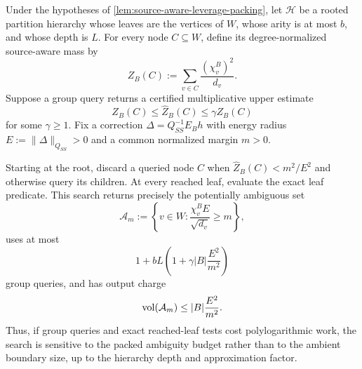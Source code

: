 \begin{lemma}
\label{lem:source-aware-hierarchical-locator}
Under the hypotheses of
\cref{lem:source-aware-leverage-packing}, let $\mathcal H$ be a rooted
partition hierarchy whose leaves are the vertices of $W$, whose arity is at
most $b$, and whose depth is $L$.  For every node $C\subseteq W$, define its
degree-normalized source-aware mass by
\begin{equation}
 Z_B(C):=\sum_{v\in C}\frac{(\chi_v^B)^2}{d_v}.
 \label{eq:source-aware-group-mass}
\end{equation}
Suppose a group query returns a certified multiplicative upper estimate
\begin{equation}
 Z_B(C)\leq\widehat Z_B(C)\leq\gamma Z_B(C)
 \label{eq:source-aware-group-oracle}
\end{equation}
for some $\gamma\geq1$.  Fix a correction
$\Delta=Q_{SS}^{-1}E_Bh$ with energy radius
$E:=\|\Delta\|_{Q_{SS}}>0$ and a common normalized margin $m>0$.

Starting at the root, discard a queried node $C$ when
$\widehat Z_B(C)<m^2/E^2$ and otherwise query its children.  At every reached
leaf, evaluate the exact leaf predicate.  This search returns precisely the
potentially ambiguous set
\begin{equation*}
 \mathcal A_m
 :=\left\{v\in W:
     \frac{\chi_v^B E}{\sqrt{d_v}}\geq m
   \right\},
\end{equation*}
uses at most
\begin{equation}
 1+bL\left(1+\gamma|B|\frac{E^2}{m^2}\right)
 \label{eq:source-aware-group-query-count}
\end{equation}
group queries, and has output charge
\begin{equation}
 \operatorname{vol}(\mathcal A_m)\leq |B|\frac{E^2}{m^2}.
 \label{eq:source-aware-locator-output}
\end{equation}
Thus, if group queries and exact reached-leaf tests cost polylogarithmic work,
the search is sensitive to the packed ambiguity budget rather than to the
ambient boundary size, up to the hierarchy depth and approximation factor.
\end{lemma}

